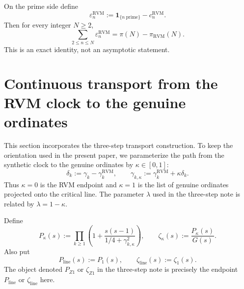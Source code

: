 \documentclass[11pt,reqno]{amsart}
\theoremstyle{definition}
\theoremstyle{remark}
\newcommand{\eps}{\varepsilon}
\newcommand{\RVM}{\mathrm{RVM}}
\newcommand{\linez}{\mathrm{line}}
\begin{document}
On the prime side define
\begin{equation}\label{eq:prime-defect}
 \eps_n^{\RVM}
 :=\mathbf 1_{\{n\ \mathrm{prime}\}}-c_n^{\RVM}.
\end{equation}
Then for every integer $N\ge2$,
\begin{equation}\label{eq:prime-defect-cumulative}
 \boxed{
 \sum_{2\le n\le N}\eps_n^{\RVM}
 =\pi(N)-\pi_{\RVM}(N).}
\end{equation}
This is an exact identity, not an asymptotic statement.

\section{Continuous transport from the RVM clock to the genuine ordinates}

This section incorporates the three-step transport construction.  To keep the orientation used in the present paper, we parameterize the path from the synthetic clock to the genuine ordinates by $\kappa\in[0,1]$:
\begin{equation}\label{eq:transport-delta}
 \delta_k:=\gamma_k-\gamma_k^{\RVM},
 \qquad
 \gamma_{k,\kappa}
 :=\gamma_k^{\RVM}+\kappa\delta_k.
\end{equation}
Thus $\kappa=0$ is the RVM endpoint and $\kappa=1$ is the list of genuine ordinates projected onto the critical line.  The parameter $\lambda$ used in the three-step note is related by $\lambda=1-\kappa$.

Define
\begin{equation}\label{eq:path-product}
 P_\kappa(s)
 :=\prod_{k\ge1}
 \left(1+\frac{s(s-1)}{1/4+\gamma_{k,\kappa}^2}\right),
 \qquad
 \zeta_\kappa(s):=\frac{P_\kappa(s)}{G(s)}.
\end{equation}
Also put
\begin{equation}\label{eq:Pline}
 P_{\linez}(s):=P_1(s),
 \qquad
 \zeta_{\linez}(s):=\zeta_1(s).
\end{equation}
The object denoted $P_{Z1}$ or $\zeta_{Z1}$ in the three-step note is precisely the endpoint $P_{\linez}$ or $\zeta_{\linez}$ here.
\end{document}
